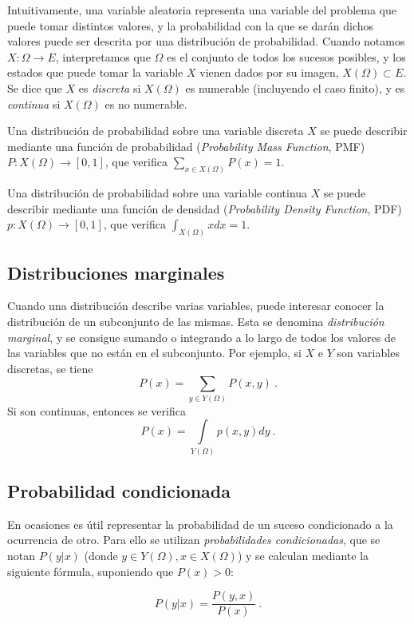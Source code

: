 Intuitivamente, una variable aleatoria representa una variable del
problema que puede tomar distintos valores, y la probabilidad con la que
se darán dichos valores puede ser descrita por una distribución de
probabilidad. Cuando notamos \(X:\Omega\rightarrow E\), interpretamos
que \(\Omega\) es el conjunto de todos los sucesos posibles, y los
estados que puede tomar la variable \(X\) vienen dados por su imagen,
\(X(\Omega)\subset E\). Se dice que \(X\) es \emph{discreta} si
\(X(\Omega)\) es numerable (incluyendo el caso finito), y es
\emph{continua} si \(X(\Omega)\) es no numerable.

Una distribución de probabilidad sobre una variable discreta \(X\) se
puede describir mediante una función de probabilidad (\emph{Probability
Mass Function}, PMF) \(P:X(\Omega)\rightarrow [0,1]\), que verifica
\(\sum_{x\in X(\Omega)} P(x)=1\).

Una distribución de probabilidad sobre una variable continua \(X\) se
puede describir mediante una función de densidad (\emph{Probability
Density Function}, PDF) \(p:X(\Omega)\rightarrow [0,1]\), que verifica
\(\int_{X(\Omega)} x dx=1\).

\subsection{Distribuciones marginales}\label{marginal}

Cuando una distribución describe varias variables, puede interesar
conocer la distribución de un subconjunto de las mismas. Esta se
denomina \emph{distribución marginal}, y se consigue sumando o
integrando a lo largo de todos los valores de las variables que no están
en el subconjunto. Por ejemplo, si \(X\) e \(Y\) son variables
discretas, se tiene \[P(x) = \sum_{y\in Y(\Omega)}P(x, y)~.\] Si son
continuas, entonces se verifica
\[P(x) = \int\limits_{Y(\Omega)}p(x, y)dy~.\]

\subsection{Probabilidad condicionada}\label{probabilidad-condicionada}

En ocasiones es útil representar la probabilidad de un suceso
condicionado a la ocurrencia de otro. Para ello se utilizan
\emph{probabilidades condicionadas}, que se notan \(P(y|x)\) (donde
\(y\in Y(\Omega), x\in X(\Omega)\)) y se calculan mediante la siguiente
fórmula, suponiendo que \(P(x) > 0\):

\begin{equation}P(y|x)=\frac{P(y,x)}{P(x)}~.\label{eq:cond}\end{equation}

